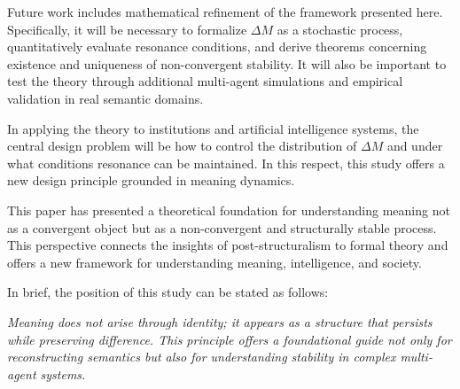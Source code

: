 \documentclass[11pt,a4paper]{article}
\theoremstyle{definition}
\begin{document}
Future work includes mathematical refinement of the framework presented here. Specifically, it will be necessary to formalize $\Delta M$ as a stochastic process, quantitatively evaluate resonance conditions, and derive theorems concerning existence and uniqueness of non-convergent stability. It will also be important to test the theory through additional multi-agent simulations and empirical validation in real semantic domains.

In applying the theory to institutions and artificial intelligence systems, the central design problem will be how to control the distribution of $\Delta M$ and under what conditions resonance can be maintained. In this respect, this study offers a new design principle grounded in meaning dynamics.

This paper has presented a theoretical foundation for understanding meaning not as a convergent object but as a non-convergent and structurally stable process. This perspective connects the insights of post-structuralism to formal theory and offers a new framework for understanding meaning, intelligence, and society.

In brief, the position of this study can be stated as follows:

\textit{Meaning does not arise through identity; it appears as a structure that persists while preserving difference. This principle offers a foundational guide not only for reconstructing semantics but also for understanding stability in complex multi-agent systems.}
\end{document}
